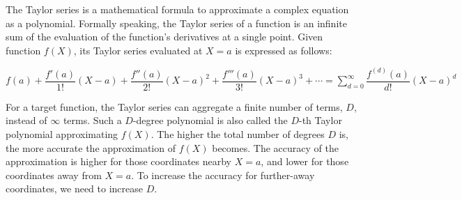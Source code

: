 The Taylor series is a mathematical formula to approximate a complex equation as a polynomial. Formally speaking, the Taylor series of a function is an infinite sum of the evaluation of the function's derivatives at a single point. Given function $f(X)$, its Taylor series evaluated at $X=a$ is expressed as follows:

$
f(a) + \dfrac{f'(a)}{1!}(X - a) + \dfrac{f''(a)}{2!}(X - a)^2 + \dfrac{f'''(a)}{3!}(X - a)^3 + \cdots = \sum\limits_{d=0}^{\infty}\dfrac{f^{(d)}(a)}{d!}(X - a)^d
$

For a target function, the Taylor series can aggregate a finite number of terms, $D$, instead of $\infty$ terms. Such a $D$-degree polynomial is also called the $D$-th Taylor polynomial approximating $f(X)$. The higher the total number of degrees $D$ is, the more accurate the approximation of $f(X)$ becomes. The accuracy of the approximation is higher for those coordinates nearby $X=a$, and lower for those coordinates away from $X=a$. To increase the accuracy for further-away coordinates, we need to increase $D$. 
